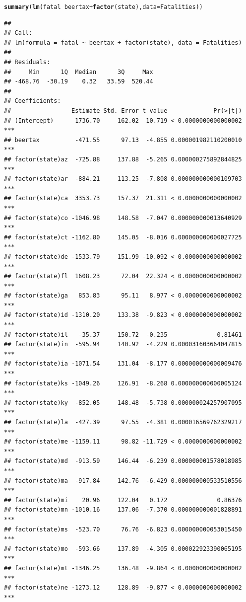 \documentclass[onesided]{article}\usepackage[]{graphicx}\usepackage[]{color}
\makeatletter
\newcommand{\hlopt}[1]{\textcolor[rgb]{0,0,0}{#1}}%
\newcommand{\hlstd}[1]{\textcolor[rgb]{0.345,0.345,0.345}{#1}}%
\newcommand{\hlkwc}[1]{\textcolor[rgb]{0.333,0.667,0.333}{#1}}%
\newcommand{\hlkwd}[1]{\textcolor[rgb]{0.737,0.353,0.396}{\textbf{#1}}}%
\newenvironment{kframe}{%
 \def\at@end@of@kframe{}%
 \ifinner\ifhmode%
  \def\at@end@of@kframe{\end{minipage}}%
  \begin{minipage}{\columnwidth}%
 \fi\fi%
 \def\FrameCommand##1{\hskip\@totalleftmargin \hskip-\fboxsep
 \colorbox{shadecolor}{##1}\hskip-\fboxsep
     \hskip-\linewidth \hskip-\@totalleftmargin \hskip\columnwidth}%
 \MakeFramed {\advance\hsize-\width
   \@totalleftmargin\z@ \linewidth\hsize
   \@setminipage}}%
 {\par\unskip\endMakeFramed%
 \at@end@of@kframe}
\newenvironment{knitrout}{}{} %
\makeatother
\begin{document}
\begin{knitrout}
\color{fgcolor}\begin{kframe}
\begin{alltt}
\hlkwd{summary}\hlstd{(}\hlkwd{lm}\hlstd{(fatal} \hlopt{~} \hlstd{beertax} \hlopt{+} \hlkwd{factor}\hlstd{(state),} \hlkwc{data} \hlstd{= Fatalities))}
\end{alltt}
\begin{verbatim}
## 
## Call:
## lm(formula = fatal ~ beertax + factor(state), data = Fatalities)
## 
## Residuals:
##     Min      1Q  Median      3Q     Max 
## -468.76  -30.19    0.32   33.59  520.44 
## 
## Coefficients:
##                 Estimate Std. Error t value             Pr(>|t|)    
## (Intercept)      1736.70     162.02  10.719 < 0.0000000000000002 ***
## beertax          -471.55      97.13  -4.855 0.000001982110200010 ***
## factor(state)az  -725.88     137.88  -5.265 0.000000275892844825 ***
## factor(state)ar  -884.21     113.25  -7.808 0.000000000000109703 ***
## factor(state)ca  3353.73     157.37  21.311 < 0.0000000000000002 ***
## factor(state)co -1046.98     148.58  -7.047 0.000000000013640929 ***
## factor(state)ct -1162.80     145.05  -8.016 0.000000000000027725 ***
## factor(state)de -1533.79     151.99 -10.092 < 0.0000000000000002 ***
## factor(state)fl  1608.23      72.04  22.324 < 0.0000000000000002 ***
## factor(state)ga   853.83      95.11   8.977 < 0.0000000000000002 ***
## factor(state)id -1310.20     133.38  -9.823 < 0.0000000000000002 ***
## factor(state)il   -35.37     150.72  -0.235              0.81461    
## factor(state)in  -595.94     140.92  -4.229 0.000031603664047815 ***
## factor(state)ia -1071.54     131.04  -8.177 0.000000000000009476 ***
## factor(state)ks -1049.26     126.91  -8.268 0.000000000000005124 ***
## factor(state)ky  -852.05     148.48  -5.738 0.000000024257907095 ***
## factor(state)la  -427.39      97.55  -4.381 0.000016569762329217 ***
## factor(state)me -1159.11      98.82 -11.729 < 0.0000000000000002 ***
## factor(state)md  -913.59     146.44  -6.239 0.000000001578018985 ***
## factor(state)ma  -917.84     142.76  -6.429 0.000000000533510556 ***
## factor(state)mi    20.96     122.04   0.172              0.86376    
## factor(state)mn -1010.16     137.06  -7.370 0.000000000001828891 ***
## factor(state)ms  -523.70      76.76  -6.823 0.000000000053015450 ***
## factor(state)mo  -593.66     137.89  -4.305 0.000022923390065195 ***
## factor(state)mt -1346.25     136.48  -9.864 < 0.0000000000000002 ***
## factor(state)ne -1273.12     128.89  -9.877 < 0.0000000000000002 ***

\end{verbatim}
\end{kframe}
\end{knitrout}
\end{document}
